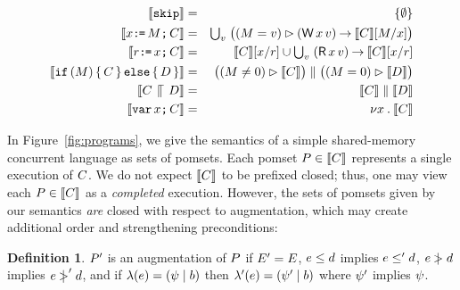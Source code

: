 \documentclass[conference]{IEEEtran}
\theoremstyle{plain}
\theoremstyle{definition}
\newtheorem{definition}[theorem]{Definition}
\begin{document}
\begin{figure*}
\begin{eqnarray*}
  \sem{\SKIP} & = & \{ \emptyset \} \\
  \sem{\aLoc\GETS\aExp\SEMI \aCmd} & = & \textstyle\bigcup_\aVal\; \bigl((\aExp=\aVal) \guard (\DW\aLoc\aVal) \prefix \sem{\aCmd}[\aExp/\aLoc]\bigr) \\
  \sem{\aReg\GETS\aLoc\SEMI \aCmd} & = & \sem{\aCmd}[\aLoc/\aReg] \cup \textstyle\bigcup_\aVal\; (\DR\aLoc\aVal) \prefix \sem{\aCmd}[\aLoc/\aReg] \\
  \sem{\IF (\aExp) \THEN \aCmd \ELSE \bCmd \FI} & = & \bigl((\aExp \neq 0) \guard \sem{\aCmd}\bigr) \parallel \bigl((\aExp=0) \guard \sem{\bCmd}\bigr) \\
  \sem{\aCmd \PAR \bCmd} & = & \sem{\aCmd} \parallel \sem{\bCmd} \\
  \sem{\VAR\aLoc\SEMI \aCmd} & = & \nu \aLoc \st \sem{\aCmd}
\end{eqnarray*}
\caption{Semantics of a concurrent shared-memory language}
\label{fig:programs}
\end{figure*}

In Figure~\ref{fig:programs}, we give the semantics of a simple shared-memory
concurrent language as sets of pomsets.  
Each pomset
$P\in\llbracket C\rrbracket$ represents a single execution of $C$.  We do not
expect $\llbracket C\rrbracket$ to be prefixed closed; thus, one may view each
$P\in\llbracket C\rrbracket$ as a \emph{completed} execution.  However, the sets of
pomsets given by our semantics \emph{are} closed with respect to
augmentation, which may create additional order and strengthening
preconditions:
\begin{definition}
  $P'$ is an augmentation of $P$ if $E'=E$, $e\le d$
  implies $e\le'd$, $e\mathrel{\,\mid\!\!\!>}d$ implies $e\mathrel{\,\mid\!\!\!>}'d$, and
  if $\lambda(e) = (\psi \mid b)$ then
  $\lambda'(e) = (\psi' \mid b)$ where $\psi'$ implies
  $\psi$.
\end{definition}
\end{document}
